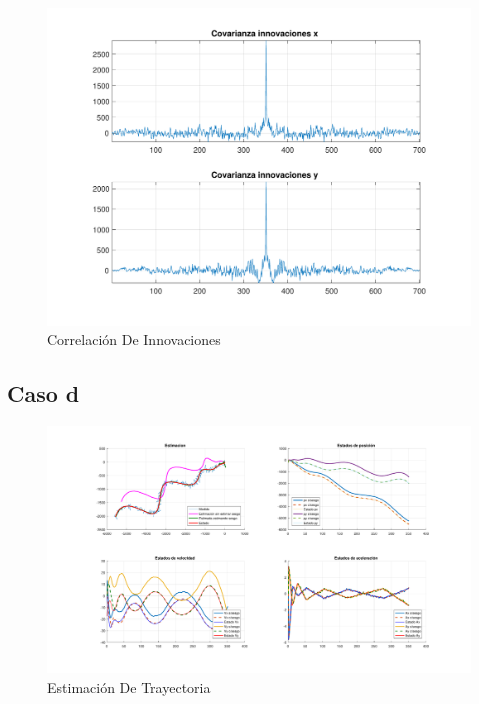 	\begin{figure}[H]
		\centering
		\includegraphics[width=1.0\textwidth,keepaspectratio]{Figuras/covinn_ej4c.pdf}
		\caption{Correlación De Innovaciones}
		\label{fig:ej4c_cov}
	\end{figure}
	

\subsection{Caso d}

	\begin{figure}[H]
		\centering
		\includegraphics[width=1.0\textwidth,keepaspectratio]{Figuras/graf_ej4d.pdf}
		\caption{Estimación De Trayectoria}
		\label{fig:ej4d}
	\end{figure}
	

